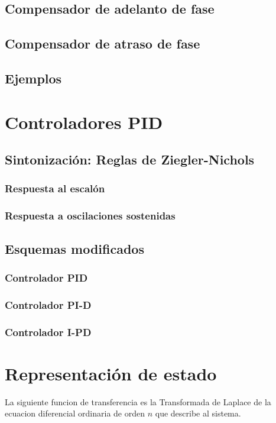 \documentclass[12pt]{article}
\numberwithin{equation}{subsection}
\begin{document}
\subsection{Compensador de adelanto de fase}
\subsection{Compensador de atraso de fase}
\subsection{Ejemplos}

\newpage
\section{Controladores PID}
\subsection{Sintonización: Reglas de Ziegler-Nichols}
\subsubsection{Respuesta al escalón}
\subsubsection{Respuesta a oscilaciones sostenidas}
\subsection{Esquemas modificados}
\subsubsection{Controlador PID}
\subsubsection{Controlador PI-D}
\subsubsection{Controlador I-PD}

\newpage
\section{Representación de estado}

La siguiente funcion de transferencia es la Transformada de Laplace de la ecuacion diferencial ordinaria de orden $n$ que describe al sistema.
\end{document}
